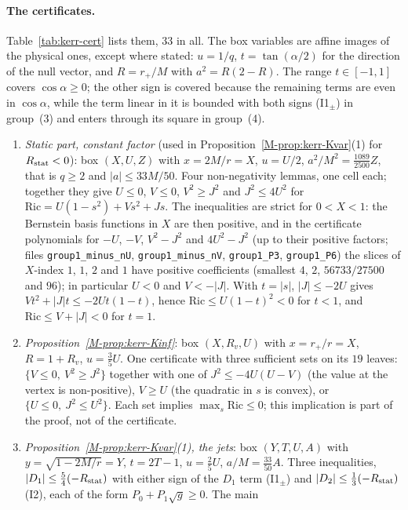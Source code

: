 \documentclass[aip,jmp,amsmath,amssymb,reprint]{revtex4-2}
\theoremstyle{plain}
\theoremstyle{definition}
\begin{document}
\paragraph{The certificates.} Table~\ref{tab:kerr-cert} lists them, $33$ in all. The box variables are
affine images of the physical ones, except where stated: $u=1/q$, $t=\tan(\alpha/2)$ for the direction of the
null vector, and $R=r_+/M$ with $a^2=R(2-R)$. The range $t\in[-1,1]$ covers $\cos\alpha\ge0$; the other sign is
covered because the remaining terms are even in $\cos\alpha$, while the term linear in it is bounded with both signs
(I1$_\pm$) in group~(3) and enters through its square in group~(4).
\begin{enumerate}
\item \emph{Static part, constant factor} (used in Proposition~\ref{M-prop:kerr-Kvar}(1) for $R_{\rm stat}<0$):
  box $(X,U,Z)$ with $x=2M/r=X$, $u=U/2$, $a^2/M^2=\frac{1089}{2500}Z$, that is $q\ge2$ and $|a|\le33M/50$. Four
  non-negativity lemmas, one cell each; together they give $U\le0$, $V\le0$, $V^2\ge J^2$ and $J^2\le4U^2$ for
  $\mathrm{Ric}=U(1-s^2)+Vs^2+Js$. The inequalities are strict for $0<X<1$: the Bernstein basis functions in $X$ are then positive, and in the
certificate polynomials for $-U$, $-V$, $V^2-J^2$ and $4U^2-J^2$ (up to their positive factors; files
\texttt{group1\_minus\_nU}, \texttt{group1\_minus\_nV}, \texttt{group1\_P3}, \texttt{group1\_P6}) the slices of
$X$-index $1$, $1$, $2$ and $1$ have positive coefficients (smallest $4$, $2$, $56733/27500$ and $96$); in particular
$U<0$ and $V<-|J|$. With $t=|s|$, $|J|\le-2U$ gives
$Vt^2+|J|t\le-2Ut(1-t)$, hence $\mathrm{Ric}\le U(1-t)^2<0$ for $t<1$, and $\mathrm{Ric}\le V+|J|<0$ for $t=1$.
\item \emph{Proposition~\ref{M-prop:kerr-Kinf}}: box $(X,R_v,U)$ with $x=r_+/r=X$, $R=1+R_v$, $u=\frac35U$. One
  certificate with three sufficient sets on its $19$ leaves: $\{V\le0,\ V^2\ge J^2\}$ together with one of
  $J^2\le-4U(U-V)$ (the value at the vertex is non-positive), $V\ge U$ (the quadratic in $s$ is convex), or
  $\{U\le0,\ J^2\le U^2\}$. Each set implies $\max_s\mathrm{Ric}\le0$; this implication is part of the proof, not of
  the certificate.
\item \emph{Proposition~\ref{M-prop:kerr-Kvar}(1), the jets}: box $(Y,T,U,A)$ with $y=\sqrt{1-2M/r}=Y$, $t=2T-1$,
  $u=\frac25U$, $a/M=\frac{33}{50}A$. Three inequalities, $|D_1|\le\frac54(-R_{\rm stat})$ with either sign of the
  $D_1$ term (I1$_\pm$) and $|D_2|\le\frac13(-R_{\rm stat})$ (I2), each of the form $P_0+P_1\sqrt g\ge0$. The main

\end{enumerate}
\end{document}
